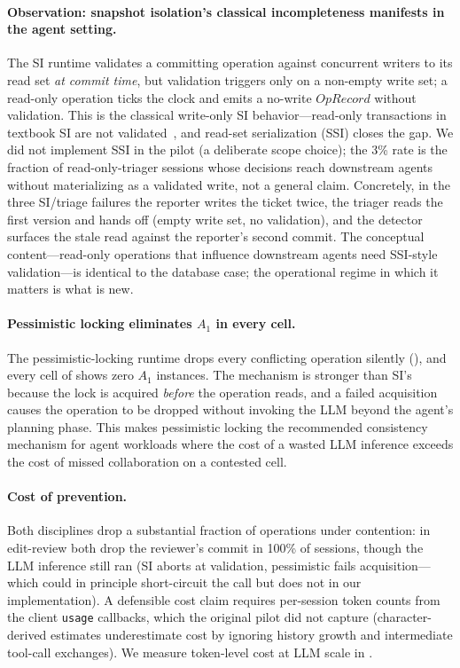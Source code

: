 \documentclass[journal,compsoc,10pt]{IEEEtran}
\providecommand{\citep}{\cite}
\theoremstyle{definition}
\theoremstyle{remark}
\newcommand{\fld}[1]{\mathit{#1}}
\begin{document}
\paragraph{Observation: snapshot isolation's classical incompleteness manifests in the agent setting.}
The SI runtime validates a committing operation against concurrent writers
to its read set \emph{at commit time}, but validation triggers only on a
non-empty write set; a read-only operation ticks the clock and emits a
no-write $\fld{OpRecord}$ without validation. This is the classical
write-only SI behavior---read-only transactions in textbook SI are not
validated~\citep{CahillRohmFekete2008SSI,FeketeEtAl2005MakingSI}, and
read-set serialization (SSI) closes the gap. We did not implement SSI in
the pilot (a deliberate scope choice); the 3\% rate is the fraction of
read-only-triager sessions whose decisions reach downstream agents without
materializing as a validated write, not a general claim. Concretely, in
the three SI/triage failures the reporter writes the ticket twice, the
triager reads the first version and hands off (empty write set, no
validation), and the detector surfaces the stale read against the
reporter's second commit. The conceptual content---read-only operations
that influence downstream agents need SSI-style validation---is identical
to the database case; the operational regime in which it matters is what
is new.

\paragraph{Pessimistic locking eliminates $A_1$ in every cell.}
The pessimistic-locking runtime drops every conflicting operation
silently (), and every cell of
 shows zero $A_1$ instances. The
mechanism is stronger than SI's because the lock is acquired
\emph{before} the operation reads, and a failed acquisition causes
the operation to be dropped without invoking the LLM beyond the
agent's planning phase. This makes pessimistic locking the
recommended consistency mechanism for agent workloads where the
cost of a wasted LLM inference exceeds the cost of missed
collaboration on a contested cell.

\paragraph{Cost of prevention.}
Both disciplines drop a substantial fraction of operations under
contention: in edit-review both drop the reviewer's commit in 100\% of
sessions, though the LLM inference still ran (SI aborts at validation,
pessimistic fails acquisition---which could in principle short-circuit the
call but does not in our implementation). A defensible cost claim requires
per-session token counts from the client \texttt{usage} callbacks, which
the original pilot did not capture (character-derived estimates
underestimate cost by ignoring history growth and intermediate tool-call
exchanges). We measure token-level cost at LLM scale in
.
\end{document}

